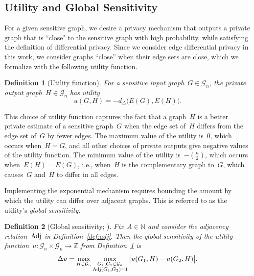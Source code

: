\documentclass[conference]{ieeeconf}
\newtheorem{definition}{Definition}
\newcommand{\G}{\mathcal{G}}
\newcommand{\uti}{d_\Delta}
\begin{document}
\subsection{Utility and Global Sensitivity} \label{sec:utility}
For a given sensitive graph, we desire a privacy mechanism that outputs a private graph that is ``close" to the sensitive graph with high probability, while satisfying the definition of differential privacy. Since we consider edge differential privacy in this work, we consider graphs ``close'' when their edge sets are close, which we formalize with the following utility function. 

\begin{definition}[Utility function]\label{def:util}
    For a sensitive input graph~$G \in \G_n$, the private output graph~$H\in \G_n$ has utility
    \begin{equation}\label{eq:utilityy}
    u(G, H) = -\uti\big(E(G), E(H)\big).
    \end{equation}
\end{definition}

This choice of utility function captures the fact that a graph~$H$ is a better private
estimate of a sensitive graph~$G$ when the edge set of~$H$ differs from the edge set of~$G$ by fewer edges. 
The maximum value of the utility is~$0$, which occurs when~$H = G$, and all other choices
of private outputs give negative values of the utility function. 
The minimum value of the utility is~$-\binom{n}{2}$,
which occurs when~$E(H) = \bar{E}(G)$, i.e., when~$H$ is the complementary graph
to~$G$, which causes~$G$ and~$H$ to differ in all edges. 


Implementing the exponential mechanism requires bounding the amount 
by which the utility can differ over adjacent graphs. This is referred to as the utility's \emph{global sensitivity}. 

\begin{definition}[{Global sensitivity; \cite[Section 3.4]{dwork2014algorithmic}}]\label{def:sensitivity}
    Fix~$A \in \mathbb{N}$ and consider the adjacency relation~$\textnormal{Adj}$ in Definition~\ref{def:adj}. 
    Then the global sensitivity of the utility function~$u: \G_n \times \G_n \to \mathbb{Z}$ from Definition~\ref{def:util} is 
    \begin{equation}
        \Delta u = \max_{H \in \G_n} \max_{\substack{G_1, G_2 \in \G_n \\ \textnormal{Adj}(G_1, G_2) = 1}} \big|u(G_1, H)-u(G_2, H)\big|. 
    \end{equation}
\end{definition}
\end{document}
